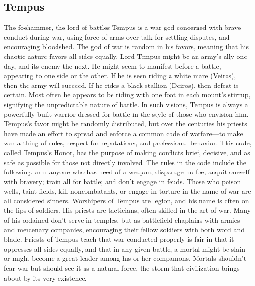 \documentclass[10pt,a4paper,twoside,twocolumn,openany,bg=print,nodeprecatedcode]{dndbook}
\begin{document}
\subsection{Tempus}
The foehammer, the lord of battles
Tempus is a war god concerned with brave conduct during war, using force of arms over talk for settling disputes, and encouraging bloodshed. The god of war is random in his favors, meaning that his chaotic nature favors all sides equally. Lord Tempus might be an army's ally one day, and its enemy the next. He might seem to manifest before a battle, appearing to one side or the other. If he is seen riding a white mare (Veiros), then the army will succeed. If he rides a black stallion (Deiros), then defeat is certain. Most often he appears to be riding with one foot in each mount's stirrup, signifying the unpredictable nature of battle. In such visions, Tempus is always a powerfully built warrior dressed for battle in the style of those who envision him.
Tempus's favor might be randomly distributed, but over the centuries his priests have made an effort to spread and enforce a common code of warfare—to make war a thing of rules, respect for reputations, and professional behavior. This code, called Tempus's Honor, has the purpose of making conflicts brief, decisive, and as safe as possible for those not directly involved. The rules in the code include the following: arm anyone who has need of a weapon; disparage no foe; acquit oneself with bravery; train all for battle; and don't engage in feuds. Those who poison wells, taint fields, kill noncombatants, or engage in torture in the name of war are all considered sinners.
Worshipers of Tempus are legion, and his name is often on the lips of soldiers. His priests are tacticians, often skilled in the art of war. Many of his ordained don't serve in temples, but as battlefield chaplains with armies and mercenary companies, encouraging their fellow soldiers with both word and blade. Priests of Tempus teach that war conducted properly is fair in that it oppresses all sides equally, and that in any given battle, a mortal might be slain or might become a great leader among his or her companions. Mortals shouldn't fear war but should see it as a natural force, the storm that civilization brings about by its very existence.
\end{document}

